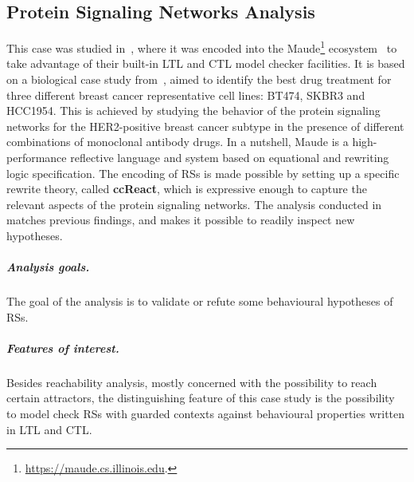 
\subsection{Protein Signaling Networks Analysis}\label{sec:ccReact}

This case was studied in~\cite{DBLP:conf/cmsb/BallisBFO24}, where it was encoded into the Maude\footnote{\url{https://maude.cs.illinois.edu}.} ecosystem~\cite{DBLP:conf/maude/2007} to take advantage of their built-in LTL and CTL model checker facilities. It is based on a biological case study from~\cite{derHeyde2014}, aimed to identify the best drug treatment for three different breast cancer representative cell lines: BT474, SKBR3 and HCC1954. This is achieved by studying the behavior of the protein signaling networks for the HER2-positive breast cancer subtype in the presence of different combinations of monoclonal antibody drugs.
In a nutshell, Maude is a high-performance reflective language and system based on equational and rewriting logic specification. 
The encoding of RSs is made possible by setting up a specific rewrite theory, called \textbf{ccReact}, which is expressive enough to capture the relevant aspects of the protein signaling networks.
The analysis conducted in~\cite{DBLP:conf/cmsb/BallisBFO24} matches previous findings, and makes it possible to readily inspect new hypotheses.

\subparagraph*{Analysis goals.}
The goal of the analysis is to validate or refute some behavioural hypotheses of RSs.

\subparagraph*{Features of interest.}
Besides reachability analysis, mostly concerned with the possibility to reach certain attractors, the distinguishing feature of this case study is the possibility to model check RSs with guarded contexts against behavioural properties written in LTL and CTL.


